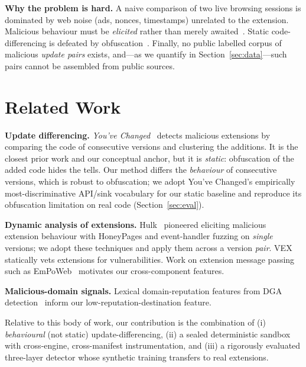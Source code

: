 \documentclass[conference]{IEEEtran}
\begin{document}
\noindent\textbf{Why the problem is hard.} A naive comparison of two live browsing sessions is
dominated by web noise (ads, nonces, timestamps) unrelated to the extension. Malicious behaviour
must be \emph{elicited} rather than merely awaited~\cite{hulk}. Static code-differencing is
defeated by obfuscation~\cite{youvechanged}. Finally, no public labelled corpus of malicious
\emph{update pairs} exists, and---as we quantify in Section~\ref{sec:data}---such pairs cannot be
assembled from public sources.

\section{Related Work}
\noindent\textbf{Update differencing.} \emph{You've Changed}~\cite{youvechanged} detects malicious
extensions by comparing the code of consecutive versions and clustering the additions. It is the
closest prior work and our conceptual anchor, but it is \emph{static}: obfuscation of the added
code hides the tells. Our method differs the \emph{behaviour} of consecutive versions, which is
robust to obfuscation; we adopt You've Changed's empirically most-discriminative API/sink
vocabulary for our static baseline and reproduce its obfuscation limitation on real code
(Section~\ref{sec:eval}).

\noindent\textbf{Dynamic analysis of extensions.} Hulk~\cite{hulk} pioneered eliciting malicious
extension behaviour with HoneyPages and event-handler fuzzing on \emph{single} versions; we adopt
these techniques and apply them across a version \emph{pair}. VEX~\cite{vex} statically vets
extensions for vulnerabilities. Work on extension message passing such as
EmPoWeb~\cite{empoweb} motivates our cross-component features.

\noindent\textbf{Malicious-domain signals.} Lexical domain-reputation features from DGA
detection~\cite{antonakakis} inform our low-reputation-destination feature.

Relative to this body of work, our contribution is the combination of (i) \emph{behavioural}
(not static) update-differencing, (ii) a sealed deterministic sandbox with cross-engine,
cross-manifest instrumentation, and (iii) a rigorously evaluated three-layer detector whose
synthetic training transfers to real extensions.

\end{document}
